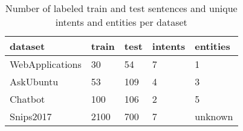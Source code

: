\begin{table}
    \centering
    \begin{tabular}{l l l l l}
        \textbf{dataset} & \textbf{train} & \textbf{test} & \textbf{intents} & \textbf{entities}\\
        \hline
        WebApplications & 30 & 54 & 7 & 1\\
        AskUbuntu & 53 & 109 & 4 & 3\\
        Chatbot & 100 & 106 & 2 & 5\\
        Snips2017 & 2100 & 700 & 7 & unknown\\
    \end{tabular}
    \caption{Number of labeled train and test sentences and unique intents and entities per dataset}
    \label{tab:corpora}
\end{table}
